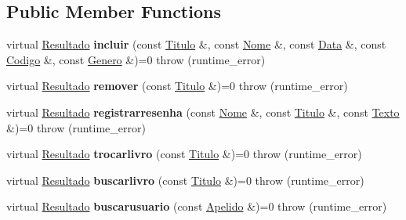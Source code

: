 \subsection*{Public Member Functions}
\begin{DoxyCompactItemize}
\item 
\mbox{\label{classILNComandosusuarioautenticado_ab2ca5ec649e35c255365036e6b01b9d3}} 
virtual \hyperlink{classResultado}{Resultado} {\bfseries incluir} (const \hyperlink{classTitulo}{Titulo} \&, const \hyperlink{classNome}{Nome} \&, const \hyperlink{classData}{Data} \&, const \hyperlink{classCodigo}{Codigo} \&, const \hyperlink{classGenero}{Genero} \&)=0  throw (runtime\+\_\+error)
\item 
\mbox{\label{classILNComandosusuarioautenticado_a3aa5a13eeee0cb3e29cece7863fc4ea7}} 
virtual \hyperlink{classResultado}{Resultado} {\bfseries remover} (const \hyperlink{classTitulo}{Titulo} \&)=0  throw (runtime\+\_\+error)
\item 
\mbox{\label{classILNComandosusuarioautenticado_a48070d42283390450ae47e465aa81751}} 
virtual \hyperlink{classResultado}{Resultado} {\bfseries registrarresenha} (const \hyperlink{classNome}{Nome} \&, const \hyperlink{classTitulo}{Titulo} \&, const \hyperlink{classTexto}{Texto} \&)=0  throw (runtime\+\_\+error)
\item 
\mbox{\label{classILNComandosusuarioautenticado_a38e0e08ef0a0c1e797cfe1794f3f3eda}} 
virtual \hyperlink{classResultado}{Resultado} {\bfseries trocarlivro} (const \hyperlink{classTitulo}{Titulo} \&)=0  throw (runtime\+\_\+error)
\item 
\mbox{\label{classILNComandosusuarioautenticado_a5c82aec8f7d5211ab0a1acc445d8f3dd}} 
virtual \hyperlink{classResultado}{Resultado} {\bfseries buscarlivro} (const \hyperlink{classTitulo}{Titulo} \&)=0  throw (runtime\+\_\+error)
\item 
\mbox{\label{classILNComandosusuarioautenticado_a7e33d964a8961cd305b67e2f6184b9a6}} 
virtual \hyperlink{classResultado}{Resultado} {\bfseries buscarusuario} (const \hyperlink{classApelido}{Apelido} \&)=0  throw (runtime\+\_\+error)
\end{DoxyCompactItemize}


